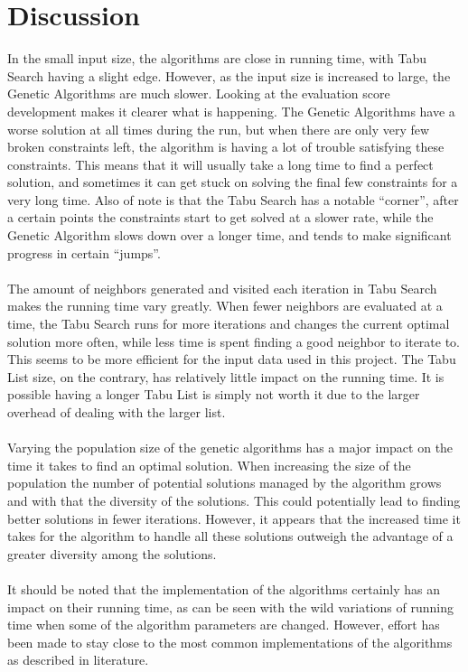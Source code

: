 \documentclass[titlepage,a4paper]{article}
\begin{document}
\section{Discussion}
In the small input size, the algorithms are close in running time, with Tabu Search having a slight edge. However, as the input size is increased to large, the Genetic Algorithms are much slower. Looking at the evaluation score development makes it clearer what is happening. The Genetic Algorithms have a worse solution at all times during the run, but when there are only very few broken constraints left, the algorithm is having a lot of trouble satisfying these constraints. This means that it will usually take a long time to find a perfect solution, and sometimes it can get stuck on solving the final few constraints for a very long time.
Also of note is that the Tabu Search has a notable “corner”, after a certain points the constraints start to get solved at a slower rate, while the Genetic Algorithm slows down over a longer time, and tends to make significant progress in certain “jumps”. \\\\
The amount of neighbors generated and visited each iteration in Tabu Search makes the running time vary greatly. When fewer neighbors are evaluated at a time, the Tabu Search runs for more iterations and changes the current optimal solution more often, while less time is spent finding a good neighbor to iterate to. This seems to be more efficient for the input data used in this project.
The Tabu List size, on the contrary, has relatively little impact on the running time. It is possible having a longer Tabu List is simply not worth it due to the larger overhead of dealing with the larger list. \\\\
Varying the population size of the genetic algorithms has a major impact on the time it takes to find an optimal solution. When increasing the size of the population the number of potential solutions managed by the algorithm grows and with that the diversity of the solutions. This could potentially lead to finding better solutions in fewer iterations. However, it appears that the increased time it takes for the algorithm to handle all these solutions outweigh the advantage of a greater diversity among the solutions. \\\\
It should be noted that the implementation of the algorithms certainly has an impact on their running time, as can be seen with the wild variations of running time when some of the algorithm parameters are changed. However, effort has been made to stay close to the most common implementations of the algorithms as described in literature.
\end{document}
